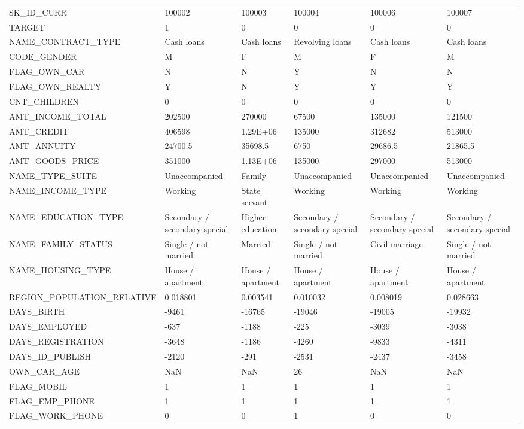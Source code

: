 \documentclass[12pt, letterpaper]{article}
\begin{document}
\begin{appendices}
{\begin{longtable}[c]{| l || p{2cm} | p{2cm} | p{2cm} | p{2cm} | p{2cm} |}
 SK_ID_CURR	&	100002	&	100003	&	100004	&	100006	&	100007	\\
TARGET	&	1	&	0	&	0	&	0	&	0	\\
NAME_CONTRACT_TYPE	&	Cash loans	&	Cash loans	&	Revolving loans	&	Cash loans	&	Cash loans	\\
CODE_GENDER	&	M	&	F	&	M	&	F	&	M	\\
FLAG_OWN_CAR	&	N	&	N	&	Y	&	N	&	N	\\
FLAG_OWN_REALTY	&	Y	&	N	&	Y	&	Y	&	Y	\\
CNT_CHILDREN	&	0	&	0	&	0	&	0	&	0	\\
AMT_INCOME_TOTAL	&	202500	&	270000	&	67500	&	135000	&	121500	\\
AMT_CREDIT	&	406598	&	1.29E+06	&	135000	&	312682	&	513000	\\
AMT_ANNUITY	&	24700.5	&	35698.5	&	6750	&	29686.5	&	21865.5	\\
AMT_GOODS_PRICE	&	351000	&	1.13E+06	&	135000	&	297000	&	513000	\\
NAME_TYPE_SUITE	&	Unaccompanied	&	Family	&	Unaccompanied	&	Unaccompanied	&	Unaccompanied	\\
NAME_INCOME_TYPE	&	Working	&	State servant	&	Working	&	Working	&	Working	\\
NAME_EDUCATION_TYPE	&	Secondary / secondary special	&	Higher education	&	Secondary / secondary special	&	Secondary / secondary special	&	Secondary / secondary special	\\
NAME_FAMILY_STATUS	&	Single / not married	&	Married	&	Single / not married	&	Civil marriage	&	Single / not married	\\
NAME_HOUSING_TYPE	&	House / apartment	&	House / apartment	&	House / apartment	&	House / apartment	&	House / apartment	\\
REGION_POPULATION_RELATIVE	&	0.018801	&	0.003541	&	0.010032	&	0.008019	&	0.028663	\\
DAYS_BIRTH	&	-9461	&	-16765	&	-19046	&	-19005	&	-19932	\\
DAYS_EMPLOYED	&	-637	&	-1188	&	-225	&	-3039	&	-3038	\\
DAYS_REGISTRATION	&	-3648	&	-1186	&	-4260	&	-9833	&	-4311	\\
DAYS_ID_PUBLISH	&	-2120	&	-291	&	-2531	&	-2437	&	-3458	\\
OWN_CAR_AGE	&	NaN	&	NaN	&	26	&	NaN	&	NaN	\\
FLAG_MOBIL	&	1	&	1	&	1	&	1	&	1	\\
FLAG_EMP_PHONE	&	1	&	1	&	1	&	1	&	1	\\
FLAG_WORK_PHONE	&	0	&	0	&	1	&	0	&	0	\\

\end{longtable}}
\end{appendices}
\end{document}
